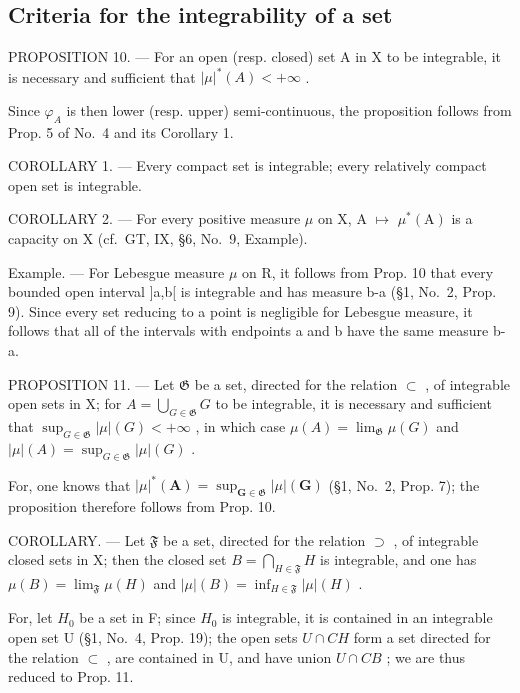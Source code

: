 \subsection{Criteria for the integrability of a set}

PROPOSITION 10. --- For an open (resp. closed) set A in X to be integrable, it is necessary and sufficient that \(|\mu|^{*}(A)<+\infty\) .

Since \(\varphi_{A}\) is then lower (resp. upper) semi-continuous, the proposition follows from Prop. 5 of No.~4 and its Corollary 1.

COROLLARY 1. --- Every compact set is integrable; every relatively compact open set is integrable.

COROLLARY 2. --- For every positive measure \(\mu\) on X, A \(\mapsto\) \(\mu^{*}(\mathrm{A})\) is a capacity on X (cf.~GT, IX, §6, No.~9, Example).

Example. --- For Lebesgue measure \(\mu\) on R, it follows from Prop. 10 that every bounded open interval {]}a,b{[} is integrable and has measure b-a (§1, No.~2, Prop. 9). Since every set reducing to a point is negligible for Lebesgue measure, it follows that all of the intervals with endpoints a and b have the same measure b-a.

PROPOSITION 11. --- Let \(\mathfrak{G}\) be a set, directed for the relation \(\subset\) , of integrable open sets in X; for \(A = \bigcup_{G \in \mathfrak{G}} G\) to be integrable, it is necessary and sufficient that \(\sup_{G \in \mathfrak{G}} |\mu|(G) < +\infty\) , in which case \(\mu(A) = \lim_{\mathfrak{G}} \mu(G)\) and \(|\mu|(A) = \sup_{G \in \mathfrak{G}} |\mu|(G)\) .

For, one knows that \(|\mu|^*(\mathbf{A}) = \sup_{\mathbf{G} \in \mathfrak{G}} |\mu|(\mathbf{G})\) (§1, No.~2, Prop. 7); the proposition therefore follows from Prop. 10.

COROLLARY. --- Let \(\mathfrak{F}\) be a set, directed for the relation \(\supset\) , of integrable closed sets in X; then the closed set \(B = \bigcap_{H \in \mathfrak{F}} H\) is integrable, and one has \(\mu(B) = \lim_{\mathfrak{F}} \mu(H)\) and \(|\mu|(B) = \inf_{H \in \mathfrak{F}} |\mu|(H)\) .

For, let \(H_{0}\) be a set in F; since \(H_{0}\) is integrable, it is contained in an integrable open set U (§1, No.~4, Prop. 19); the open sets \(U \cap CH\) form a set directed for the relation \(\subset\) , are contained in U, and have union \(U \cap CB\) ; we are thus reduced to Prop. 11.

